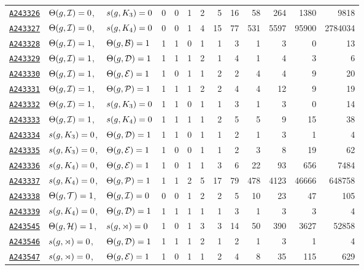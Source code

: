 \documentclass[12pt]{article}
\newcommand{\OEIS}[1]
{\href{https://oeis.org/#1}{\texttt{#1}}}
\begin{document}
\begin{appendices}
\begin{longtable}{ l l l r r r r r r r r r r}
\OEIS{A243326} & $\Theta(g,\mathcal{I}) =0$, & $s{}(g,K_3) =0$ & 0 & 0 & 1 & 2 & 5 & 16 & 58 & 264 & 1380 & 9818 \\
\OEIS{A243327} & $\Theta(g,\mathcal{I}) =0$, & $s{}(g,K_4) =0$ & 0 & 0 & 1 & 4 & 15 & 77 & 531 & 5597 & 95900 & 2784034 \\
\OEIS{A243328} & $\Theta(g,\mathcal{I}) =1$, & $\Theta(g,\mathcal{B}) =1$ & 1 & 1 & 0 & 1 & 1 & 3 & 1 & 3 & 0 & 13 \\
\OEIS{A243329} & $\Theta(g,\mathcal{I}) =1$, & $\Theta(g,\mathcal{D}) =1$ & 1 & 1 & 1 & 2 & 1 & 4 & 1 & 4 & 3 & 6 \\
\OEIS{A243330} & $\Theta(g,\mathcal{I}) =1$, & $\Theta(g,\mathcal{E}) =1$ & 1 & 0 & 1 & 1 & 2 & 2 & 4 & 4 & 9 & 20 \\
\OEIS{A243331} & $\Theta(g,\mathcal{I}) =1$, & $\Theta(g,\mathcal{P}) =1$ & 1 & 1 & 1 & 2 & 2 & 4 & 4 & 12 & 9 & 19 \\
\OEIS{A243332} & $\Theta(g,\mathcal{I}) =1$, & $s{}(g,K_3) =0$ & 1 & 1 & 0 & 1 & 1 & 3 & 1 & 3 & 0 & 14 \\
\OEIS{A243333} & $\Theta(g,\mathcal{I}) =1$, & $s{}(g,K_4) =0$ & 1 & 1 & 1 & 1 & 2 & 5 & 5 & 9 & 15 & 38 \\
\OEIS{A243334} & $s{}(g,K_3) =0$, & $\Theta(g,\mathcal{D}) =1$ & 1 & 1 & 0 & 1 & 1 & 2 & 1 & 3 & 1 & 4 \\
\OEIS{A243335} & $s{}(g,K_3) =0$, & $\Theta(g,\mathcal{E}) =1$ & 1 & 0 & 0 & 1 & 1 & 2 & 3 & 8 & 19 & 62 \\
\OEIS{A243336} & $s{}(g,K_4) =0$, & $\Theta(g,\mathcal{E}) =1$ & 1 & 0 & 1 & 1 & 3 & 6 & 22 & 93 & 656 & 7484 \\
\OEIS{A243337} & $s{}(g,K_4) =0$, & $\Theta(g,\mathcal{P}) =1$ & 1 & 1 & 2 & 5 & 17 & 79 & 478 & 4123 & 46666 & 648758 \\
\OEIS{A243338} & $\Theta(g,\mathcal{T}) =1$, & $\Theta(g,\mathcal{I}) =0$ & 0 & 0 & 1 & 2 & 2 & 5 & 10 & 23 & 47 & 105 \\
\OEIS{A243339} & $s{}(g,K_4) =0$, & $\Theta(g,\mathcal{D}) =1$ & 1 & 1 & 1 & 1 & 1 & 3 & 1 & 3 & 3 & 4 \\
\OEIS{A243545} & $\Theta(g,\mathcal{H}) =1$, & $s{}(g,\rtimes) =0$ & 1 & 0 & 1 & 3 & 3 & 14 & 50 & 390 & 3627 & 52858 \\
\OEIS{A243546} & $s{}(g,\rtimes) =0$, & $\Theta(g,\mathcal{D}) =1$ & 1 & 1 & 1 & 2 & 1 & 2 & 1 & 3 & 1 & 4 \\
\OEIS{A243547} & $s{}(g,\rtimes) =0$, & $\Theta(g,\mathcal{E}) =1$ & 1 & 0 & 1 & 1 & 2 & 4 & 8 & 35 & 115 & 629 \\

\end{longtable}
\end{appendices}
\end{document}
